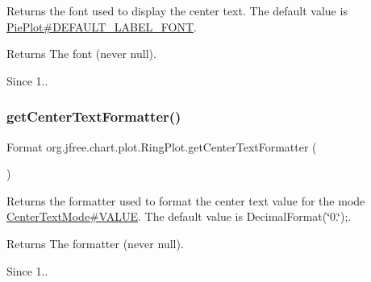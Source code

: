 Returns the font used to display the center text. The default value is \mbox{\hyperlink{classorg_1_1jfree_1_1chart_1_1plot_1_1_pie_plot_a2b4167fc959c29b242568049474f1786}{Pie\+Plot\#\+D\+E\+F\+A\+U\+L\+T\+\_\+\+L\+A\+B\+E\+L\+\_\+\+F\+O\+NT}}.

\begin{DoxyReturn}{Returns}
The font (never {\ttfamily null}).
\end{DoxyReturn}
\begin{DoxySince}{Since}
1.. 
\end{DoxySince}
\mbox{\label{classorg_1_1jfree_1_1chart_1_1plot_1_1_ring_plot_a9192f020615a88ccdc4a6ef4c6b099fb}} 
\subsubsection{\texorpdfstring{get\+Center\+Text\+Formatter()}{getCenterTextFormatter()}}
{\footnotesize\ttfamily Format org.\+jfree.\+chart.\+plot.\+Ring\+Plot.\+get\+Center\+Text\+Formatter (\begin{DoxyParamCaption}{ }\end{DoxyParamCaption})}

Returns the formatter used to format the center text value for the mode \mbox{\hyperlink{enumorg_1_1jfree_1_1chart_1_1plot_1_1_center_text_mode_a4d0a1a2e333a9542cf2a18a0444abe0d}{Center\+Text\+Mode\#\+V\+A\+L\+UE}}. The default value is {\ttfamily Decimal\+Format(\char`\"{}0.\char`\"{});}.

\begin{DoxyReturn}{Returns}
The formatter (never {\ttfamily null}).
\end{DoxyReturn}
\begin{DoxySince}{Since}
1.. 
\end{DoxySince}
\mbox{\label{classorg_1_1jfree_1_1chart_1_1plot_1_1_ring_plot_a005713e64db3d7e4bca3c7aa2cc7f6a8}} 
